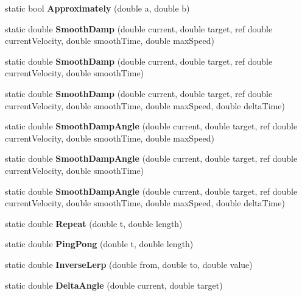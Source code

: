 \begin{DoxyCompactItemize}
static bool {\bfseries Approximately} (double a, double b)
\item 
\mbox{\label{struct_unity_engine_1_1_mathd_a85638a05cd967a88304f00d7a45d96f9}} 
static double {\bfseries Smooth\+Damp} (double current, double target, ref double current\+Velocity, double smooth\+Time, double max\+Speed)
\item 
\mbox{\label{struct_unity_engine_1_1_mathd_a8c0a7da037a5aa751468daed146fbb22}} 
static double {\bfseries Smooth\+Damp} (double current, double target, ref double current\+Velocity, double smooth\+Time)
\item 
\mbox{\label{struct_unity_engine_1_1_mathd_a9885fdb298592c5c6d8e27517926488b}} 
static double {\bfseries Smooth\+Damp} (double current, double target, ref double current\+Velocity, double smooth\+Time, double max\+Speed, double delta\+Time)
\item 
\mbox{\label{struct_unity_engine_1_1_mathd_ae20d85518eddcc7a4596d8c0cab3c212}} 
static double {\bfseries Smooth\+Damp\+Angle} (double current, double target, ref double current\+Velocity, double smooth\+Time, double max\+Speed)
\item 
\mbox{\label{struct_unity_engine_1_1_mathd_adda99bdc59e4d807358dc353e11c0213}} 
static double {\bfseries Smooth\+Damp\+Angle} (double current, double target, ref double current\+Velocity, double smooth\+Time)
\item 
\mbox{\label{struct_unity_engine_1_1_mathd_a393518101cb87230714b5025618358e6}} 
static double {\bfseries Smooth\+Damp\+Angle} (double current, double target, ref double current\+Velocity, double smooth\+Time, double max\+Speed, double delta\+Time)
\item 
\mbox{\label{struct_unity_engine_1_1_mathd_a699d48b8c58b6b1b171a2d5bdc9f7ea0}} 
static double {\bfseries Repeat} (double t, double length)
\item 
\mbox{\label{struct_unity_engine_1_1_mathd_a515cd152eb38793dbd728719f51a034b}} 
static double {\bfseries Ping\+Pong} (double t, double length)
\item 
\mbox{\label{struct_unity_engine_1_1_mathd_a6cc9def8a4d9ce439d331a6d91f2ea80}} 
static double {\bfseries Inverse\+Lerp} (double from, double to, double value)
\item 
\mbox{\label{struct_unity_engine_1_1_mathd_ab4a58f606d08c3756e70966e7d3be0e9}} 
static double {\bfseries Delta\+Angle} (double current, double target)
\end{DoxyCompactItemize}

